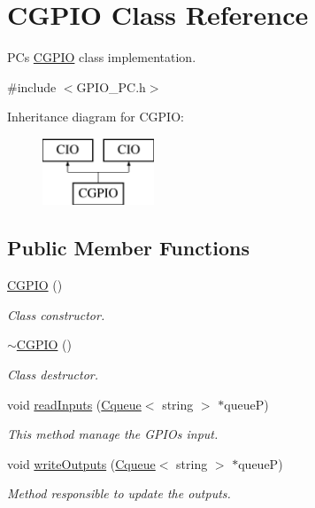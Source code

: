 \hypertarget{class_c_g_p_i_o}{}\section{C\+G\+P\+IO Class Reference}
\label{class_c_g_p_i_o}


PC\textquotesingle{}s \mbox{\hyperlink{class_c_g_p_i_o}{C\+G\+P\+IO}} class implementation.  




{\ttfamily \#include $<$G\+P\+I\+O\+\_\+\+P\+C.\+h$>$}

Inheritance diagram for C\+G\+P\+IO\+:\begin{figure}[H]
\begin{center}
\leavevmode
\includegraphics[height=2.000000cm]{class_c_g_p_i_o}
\end{center}
\end{figure}
\subsection*{Public Member Functions}
\begin{DoxyCompactItemize}
\item 
\mbox{\hyperlink{class_c_g_p_i_o_a9d4e47555fcac0233f6f3ebe36153863}{C\+G\+P\+IO}} ()
\begin{DoxyCompactList}\small\item\em Class constructor. \end{DoxyCompactList}\item 
\mbox{\label{class_c_g_p_i_o_a0751442fbab665ca1525a51361e4cfa5}} 
\mbox{\hyperlink{class_c_g_p_i_o_a0751442fbab665ca1525a51361e4cfa5}{$\sim$\+C\+G\+P\+IO}} ()
\begin{DoxyCompactList}\small\item\em Class destructor. \end{DoxyCompactList}\item 
void \mbox{\hyperlink{class_c_g_p_i_o_a6168af74d745d959e90deddb5c298385}{read\+Inputs}} (\mbox{\hyperlink{class_cqueue}{Cqueue}}$<$ string $>$ $\ast$queueP)
\begin{DoxyCompactList}\small\item\em This method manage the G\+P\+I\+Os input. \end{DoxyCompactList}\item 
void \mbox{\hyperlink{class_c_g_p_i_o_a512879113a7515680c76fac8852f69cc}{write\+Outputs}} (\mbox{\hyperlink{class_cqueue}{Cqueue}}$<$ string $>$ $\ast$queueP)
\begin{DoxyCompactList}\small\item\em Method responsible to update the outputs. \end{DoxyCompactList}\end{DoxyCompactItemize}

